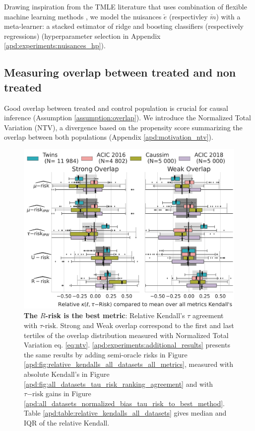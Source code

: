 \documentclass[10pt,twocolumn]{article}
\begin{document}
Drawing inspiration from the TMLE literature that uses combination of flexible
machine learning methods \cite{schuler_targeted_2017}, we model the nuisances
$\check e$ (respectivley $\check m$) with a meta-learner: a stacked estimator of ridge
and boosting classifiers (respectively regressions) (hyperparameter selection in Appendix \ref{apd:experiments:nuisances_hp}).


\subsection{Measuring overlap between treated and non treated}\label{subsec:measuring_overlap}

Good overlap between treated and control population is crucial for causal
inference (Assumption \ref{assumption:overlap}). We introduce the
Normalized Total Variation (NTV), a divergence based on the propensity score
summarizing the overlap between both populations (Appendix
\ref{apd:motivation_ntv}).

\begin{figure}[!b]
    \centering
    \includegraphics[width=\linewidth]{images/_1_r_risk_domination_r_risk_domination__ref_metric_mean_risks_by_Dataset_feasible_only.pdf}
    \caption{\textbf{The $R$-risk is the best metric}: Relative Kendall's $\tau$ agreement with $\tau\text{-risk}$.
        Strong and Weak overlap correspond to the first and last tertiles of the overlap distribution measured with
        Normalized Total Variation eq. \ref{eq:ntv}. \ref{apd:experiments:additional_results} presents the same results
        by adding semi-oracle risks in Figure \ref{apd:fig:relative_kendalls_all_datasets_all_metrics}, measured with
        absolute Kendall's in Figure \ref{apd:fig:all_datasets_tau_risk_ranking_agreement} and with $\tau\mathrm{-risk}$
        gains in Figure \ref{apd:all_datasets_normalized_bias_tau_risk_to_best_method}. Table
        \ref{apd:table:relative_kendalls_all_datasets} gives median and
        IQR of the relative Kendall.}\label{fig:relative_kendalls_all_datasets}
\end{figure}
\end{document}
